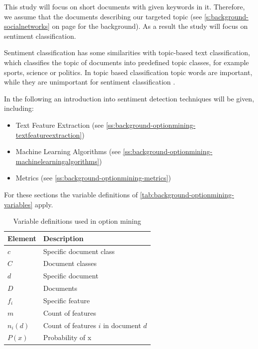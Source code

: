 This study will focus on short documents with given keywords in it.
Therefore, we assume that the documents describing our targeted topic (see \cref{s:background-socialnetworks} on page \pageref{s:background-socialnetworks} for the background).
As a result the study will focus on sentiment classification.

Sentiment classification has some similarities with topic-based text classification, which classifies the topic of documents into predefined topic classes, for example sports, science or politics.
In topic based classification topic words are important, while they are unimportant for sentiment classification \citep[page 412f]{Liu2007}.

In the following an introduction into sentiment detection techniques will be given, including:

\begin{itemize}
    \item Text Feature Extraction (see \cref{ss:background-optionmining-textfeatureextraction})
    \item Machine Learning Algorithms (see \cref{ss:background-optionmining-machinelearningalgorithms})
    \item Metrics (see \cref{ss:background-optionmining-metrics})
\end{itemize}

For these sections the variable definitions of \autoref{tab:background-optionmining-variables} apply.

\begin{table}
	\begin{center}
		\begin{tabular}{l l}
			\hline
			\textbf{Element} & \textbf{Description} \\ \hline
			$c$ & Specific document class \\
			$C$ & Document classes \\
			$d$ & Specific document \\
			$D$ & Documents \\
			$f_i$ & Specific feature \\
			$m$ & Count of features \\
			$n_i(d)$ & Count of features $i$ in document $d$ \\
			$P(x)$ & Probability of x \\ \hline
		\end{tabular}

        \caption{Variable definitions used in option mining}
        \label{tab:background-optionmining-variables}
	\end{center}
\end{table}

